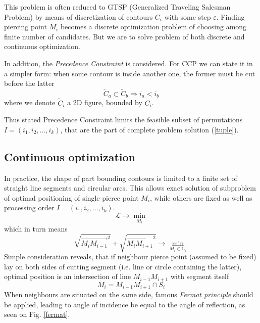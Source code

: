 \documentclass{ifacconf}
\begin{document}
This problem is often
reduced to GTSP
(Generalized Traveling Salesman Problem)
by means of
discretization of contours $C_i$
with some step $\varepsilon$.
Finding piercing point $M_i$
becomes a discrete optimization problem
of choosing among finite number of
candidates.
But we are to solve
problem of both discrete and
continuous optimization.

In addition,
the \textit{Precedence Constraint}
is considered.
For CCP we can state it in a simpler form:
when some contour is inside another one,
the former must be cut
before the latter
$$
\tilde C_a \subset \tilde C_b
\Rightarrow
i_a < i_b
$$
where we denote
$\tilde C_i$ a 2D figure,
bounded by $C_i$.

Thus stated Precedence Constraint
limits the feasible subset of permutations
$I=(i_1, i_2, \dots, i_k)$,
that are the part of
complete problem solution (\ref{tuple}).

\subsection{Continuous optimization}
In practice,
the shape of part bounding contours
is limited to a finite set
of straight line segments and circular arcs.
This allows exact solution of
subproblem of optimal
positioning of single pierce point $M_i$,
while others are fixed as well as
processing order
$I=(i_1, i_2, \dots, i_k)$.
$$
\mathcal L \to \min_{M_i}
$$
which in turn means
$$
\sqrt{\overrightarrow{M_i M_{i-1}}^2} +
\sqrt{\overrightarrow{M_i M_{i+1}}^2} \to
\min_{M_i \in C_i}
$$
Simple consideration reveals,
that
if neighbour pierce
point (assumed to be fixed)
lay on both sides of cutting segment
(i.e. line or circle containing the latter),
optimal position is an
intersection of line $M_{i-1}M_{i+1}$
with segment itself
$$
M_i = M_{i-1}M_{i+1} \cap S_i
$$
When neighbours are situated
on the same side,
famous \textit{Fermat principle}
should be applied,
leading to
angle of incidence be equal to the angle of reflection,
as seen on Fig. \ref{fermat}.
\end{document}
